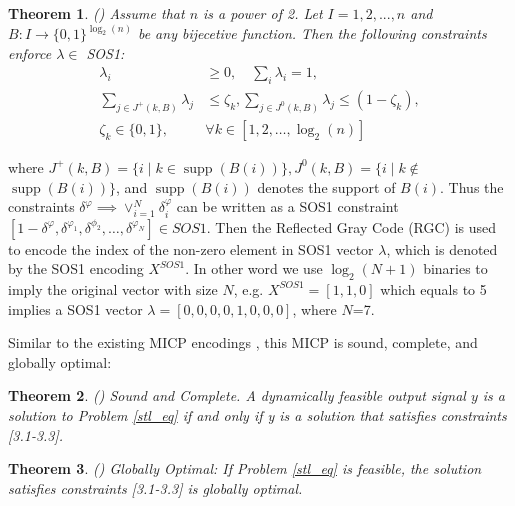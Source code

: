\documentclass[a4paper]{report}
\newtheorem{myTheo}{Theorem}
\begin{document}
\begin{myTheo}
    (\cite{vielma2011modeling}) Assume that $n$ is a power of 2. Let $I = 1,2,...,n $ and $B: I \rightarrow \{0,1\}^{\log_2(n)}$ be any bijecetive function. Then the following constraints enforce $\lambda \in$ SOS1:
    \begin{equation}
        \label{sosconstraint3}
        \begin{aligned}
            \lambda_i &\geq 0, \quad \sum_{i}\lambda_i = 1,\\
            \sum_{j \in J^{+}(k, B)} \lambda_{j} &\leq \zeta_{k},  \sum_{j \in J^{0}(k, B)}
            \lambda_{j} \leq\left(1-\zeta_{k}\right),\\
            \zeta_{k} \in\{0,1\}, \quad & \forall k \in\left[1,2, \ldots, \log _{2}(n)\right]     
        \end{aligned}
    \end{equation}
\end{myTheo}
where $J^{+}(k, B)=\{i \mid k \in \operatorname{supp}(B(i))\}, J^{0}(k, B)=\{i \mid k \notin$ $\operatorname{supp}(B(i))\}$, and $\operatorname{supp}(B(i))$ denotes the support of $B(i)$.
Thus the constraints $\delta^\varphi \implies \vee_{i=1}^{N}\delta^{\varphi}_i$ can be written as a SOS1 constraint $\left[1-\delta^{\varphi}, \delta^{\varphi_{1}}, \delta^{\phi_{2}}, \ldots, \delta^{\varphi_{N}}\right] \in S O S 1$. Then the Reflected Gray Code (RGC) \cite{vielma2011modeling} is used to encode the index of the non-zero element in SOS1 vector $\lambda$, which is denoted by the SOS1 encoding $X^{SOS1}$. In other word we use $\log_2(N+1)$ binaries to imply the original vector with size $N$, e.g. $X^{SOS1}= [1, 1, 0]$ which equals to 5 implies a SOS1 vector $\lambda=[0,0,0,0,1,0,0,0]$, where $N$=7.

Similar to the existing MICP encodings \cite[]{raman2014model}\cite[]{kurtz2022mixed}, this MICP is sound, complete, and globally optimal:

\begin{myTheo}
    (\cite{kurtz2022mixed})
    Sound and Complete. A dynamically feasible output signal $y$ is a solution to Problem \ref*{stl_eq} if and only if y is a solution that satisfies constraints [3.1-3.3].
\end{myTheo}

\begin{myTheo}
    (\cite{kurtz2022mixed})
    Globally Optimal: If Problem \ref*{stl_eq} is feasible, the solution satisfies constraints [3.1-3.3] is globally optimal.
\end{myTheo}
\end{document}
